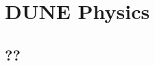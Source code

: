 \chapter{DUNE Physics}
\label{ch:exec-summ-physics}


\section{??}
\label{sec:exec-summ-physics-??}

